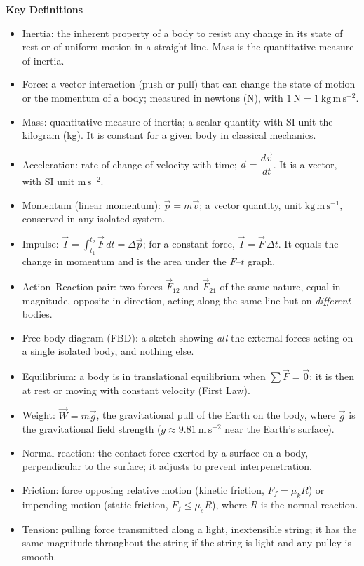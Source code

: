 \documentclass[11pt]{article}
\newcommand{\cle}[1]{{\popxbold\color{popdark}#1}}
\begin{document}
\begin{bilan}
\textbf{Key Definitions}
\begin{itemize}
\item \cle{Inertia}: the inherent property of a body to resist any change in its state of rest or of uniform motion in a straight line. Mass is the quantitative measure of inertia.
\item \cle{Force}: a vector interaction (push or pull) that can change the state of motion or the momentum of a body; measured in newtons (N), with $1\ \mathrm{N}=1\ \mathrm{kg\,m\,s^{-2}}$.
\item \cle{Mass}: quantitative measure of inertia; a scalar quantity with SI unit the kilogram (kg). It is constant for a given body in classical mechanics.
\item \cle{Acceleration}: rate of change of velocity with time; $\vec a = \dfrac{d\vec v}{dt}$. It is a vector, with SI unit $\mathrm{m\,s^{-2}}$.
\item \cle{Momentum} (linear momentum): $\vec p = m\vec v$; a vector quantity, unit $\mathrm{kg\,m\,s^{-1}}$, conserved in any isolated system.
\item \cle{Impulse}: $\vec I = \displaystyle\int_{t_1}^{t_2} \vec F\,dt = \Delta\vec p$; for a constant force, $\vec I = \vec F\,\Delta t$. It equals the change in momentum and is the area under the $F$--$t$ graph.
\item \cle{Action--Reaction pair}: two forces $\vec F_{12}$ and $\vec F_{21}$ of the same nature, equal in magnitude, opposite in direction, acting along the same line but on \emph{different} bodies.
\item \cle{Free-body diagram (FBD)}: a sketch showing \emph{all} the external forces acting on a single isolated body, and nothing else.
\item \cle{Equilibrium}: a body is in translational equilibrium when $\sum\vec F = \vec 0$; it is then at rest or moving with constant velocity (First Law).
\item \cle{Weight}: $\vec W = m\vec g$, the gravitational pull of the Earth on the body, where $\vec g$ is the gravitational field strength ($g \approx 9.81\ \mathrm{m\,s^{-2}}$ near the Earth's surface).
\item \cle{Normal reaction}: the contact force exerted by a surface on a body, perpendicular to the surface; it adjusts to prevent interpenetration.
\item \cle{Friction}: force opposing relative motion (kinetic friction, $F_f = \mu_k R$) or impending motion (static friction, $F_f \le \mu_s R$), where $R$ is the normal reaction.
\item \cle{Tension}: pulling force transmitted along a light, inextensible string; it has the same magnitude throughout the string if the string is light and any pulley is smooth.
\end{itemize}


\end{bilan}
\end{document}
